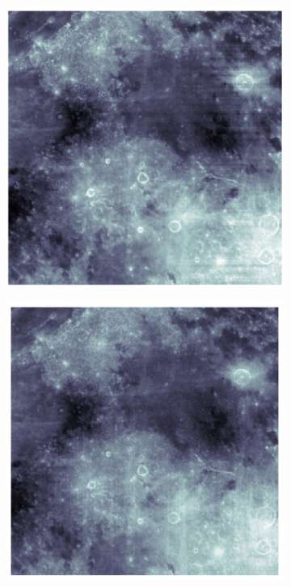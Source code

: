  \begin{figure}[ht]
    \centering
    \begin{subfigure}{0.5\textwidth}
    \centering
        \includegraphics[scale = 0.25]{pics/sep_mask_rec}
    \end{subfigure}%
    \begin{subfigure}{0.5\textwidth}
	\hspace{4cm}    
    \centering
        \includegraphics[scale= 0.25]{pics/sep_mask_rec_diff}

\end{subfigure}
\end{figure}
